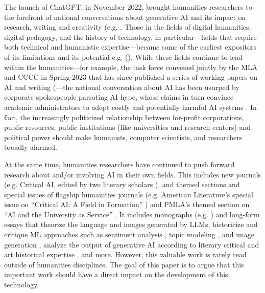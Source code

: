 The launch of ChatGPT, in November 2022, brought humanities researchers to the forefront of national conversations about generative AI and its impact on research, writing and creativity (e.g. \cite{schmidt_representation_2023,tilton_relating_2023,jones_ai_2023,crawford_archeologies_2023,broussard2023,underwood_mapping_2022}. Those in the fields of digital humanities, digital pedagogy, and the history of technology, in particular---fields that require both technical and humanistic expertise---became some of the earliest expositors of its limitations and its potential e.g. (\cite{Kirschenbaum_2023, Rogers_2023, Klein_2022}). While these fields continue to lead within the humanities---for example, the task force convened jointly by the MLA and CCCC in Spring 2023 that has since published a series of working papers on AI and writing (\cite{Byrd_Flores, Generative, Building}---the national conversation about AI has been usurped by corporate spokespeople parroting AI hype, whose claims in turn convince academic administrators to adopt costly and potentially harmful AI systems \cite{seybold_ed_2023}. In fact, the increasingly politicized relationship between for-profit corporations, public resources, public institutions (like universities and research centers) and political power should make humanists, computer scientists, and researchers broadly alarmed.  

At the same time, humanities researchers have continued to push forward research about and/or involving AI in their own fields. This includes new journals (e.g. Critical AI, edited by two literary scholars \cite{Goodlad_2023}), and themed sections and special issues of flagship humanities journals (e.g. American Literature’s special issue on ``Critical AI: A Field in Formation'' \cite{Raley_Rhee_2023}) and PMLA’s themed section on ``AI and the University as Service'' \cite{Kirschenbaum_Raley_2024}. It includes monographs (e.g. \citep{Pasquinelli, Gunkel_2012, Katz_2020, Tenen_2024}) and long-form essays that theorize the language \cite{Slater_2024} and images \cite{Wasielewski_2024} generated by LLMs, historicize and critique ML approaches such as sentiment analysis \cite{Chun_Hong_Nakamura_2024}, topic modeling \cite{Binder_2016}, and image generation \cite{Offert_Phan_2024}, analyze the output of generative AI according to literary critical \cite{Walsh_Preus_Gronski_2024} and art historical expertise \cite{Malevé_Sluis_2023}, and more. However, this valuable work is rarely read outside of humanities disciplines. The goal of this paper is to argue that this important work should have a direct impact on the development of this technology. 
